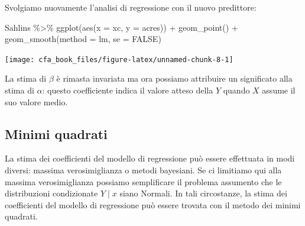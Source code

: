 \documentclass[
  11pt,
]{krantz}
\makeatletter
\newenvironment{Shaded}{\begin{snugshade}}{\end{snugshade}}
\newcommand{\AttributeTok}[1]{\textcolor[rgb]{0.61,0.61,0.61}{#1}}
\newcommand{\CommentTok}[1]{\textcolor[rgb]{0.37,0.37,0.37}{\textit{#1}}}
\newcommand{\ConstantTok}[1]{\textcolor[rgb]{0,0,0}{#1}}
\newcommand{\FunctionTok}[1]{\textcolor[rgb]{0,0,0}{#1}}
\newcommand{\NormalTok}[1]{#1}
\newcommand{\OtherTok}[1]{\textcolor[rgb]{0.37,0.37,0.37}{#1}}
\newcommand{\SpecialCharTok}[1]{\textcolor[rgb]{0,0,0}{#1}}
\newenvironment{kframe}{%
\medskip{}
\setlength{\fboxsep}{.8em}
 \def\at@end@of@kframe{}%
 \ifinner\ifhmode%
  \def\at@end@of@kframe{\end{minipage}}%
  \begin{minipage}{\columnwidth}%
 \fi\fi%
 \def\FrameCommand##1{\hskip\@totalleftmargin \hskip-\fboxsep
 \colorbox{shadecolor}{##1}\hskip-\fboxsep
     \hskip-\linewidth \hskip-\@totalleftmargin \hskip\columnwidth}%
 \MakeFramed {\advance\hsize-\width
   \@totalleftmargin\z@ \linewidth\hsize
   \@setminipage}}%
 {\par\unskip\endMakeFramed%
 \at@end@of@kframe}
\renewenvironment{Shaded}{\begin{kframe}}{\end{kframe}}
\theoremstyle{definition}
\theoremstyle{definition}
\theoremstyle{definition}
\theoremstyle{definition}
\theoremstyle{remark}
\makeatother
\begin{document}
Svolgiamo nuovamente l'analisi di regressione con il nuovo predittore:

\begin{Shaded}
\end{Shaded}

\begin{Shaded}
\begin{Highlighting}[]
\NormalTok{Sahlins }\SpecialCharTok{\%\textgreater{}\%}
  \FunctionTok{ggplot}\NormalTok{(}\FunctionTok{aes}\NormalTok{(}\AttributeTok{x =}\NormalTok{ xc, }\AttributeTok{y =}\NormalTok{ acres)) }\SpecialCharTok{+}
  \FunctionTok{geom\_point}\NormalTok{() }\SpecialCharTok{+}
  \FunctionTok{geom\_smooth}\NormalTok{(}\AttributeTok{method =}\NormalTok{ lm, }\AttributeTok{se =} \ConstantTok{FALSE}\NormalTok{)}
\end{Highlighting}
\end{Shaded}

\begin{center}\texttt{[image: cfa\_book\_files/figure-latex/unnamed-chunk-8-1]} \end{center}

La stima di \(\beta\) è rimasta invariata ma ora possiamo attribuire un significato alla stima di \(\alpha\): questo coefficiente indica il valore atteso della \(Y\) quando \(X\) assume il suo valore medio.

\hypertarget{minimi-quadrati}{%
\subsection{Minimi quadrati}\label{minimi-quadrati}}

La stima dei coefficienti del modello di regressione può essere effettuata in modi diversi: massima verosimiglianza o metodi bayesiani. Se ci limitiamo qui alla massima verosimiglianza possiamo semplificare il problema assumento che le distribuzioni condizionate \(Y \mid x\) siano Normali. In tali circostanze, la stima dei coefficienti del modello di regressione può essere trovata con il metodo dei minimi quadrati.
\end{document}
